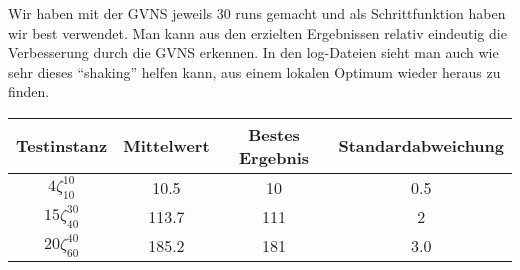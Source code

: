 \documentclass[a4paper,10pt]{article}
\begin{document}
Wir haben mit der GVNS jeweils 30 runs gemacht und als Schrittfunktion haben wir best verwendet. Man kann aus den erzielten Ergebnissen relativ eindeutig die Verbesserung durch die GVNS erkennen. In den log-Dateien sieht man auch wie sehr dieses "`shaking"' helfen kann, aus einem lokalen Optimum wieder heraus zu finden.
\bigskip

\begin{tabular}{cccc}
\hline
Testinstanz & Mittelwert & Bestes Ergebnis & Standardabweichung \\
\hline
$4\zeta_{10}^{10}$ & 10.5 & 10 & 0.5 \\									
$15\zeta_{40}^{30}$ & 113.7 & 111 & 2 \\									
$20\zeta_{60}^{40}$ & 185.2 & 181 & 3.0 \\						
\hline
\end{tabular}
\end{document}
